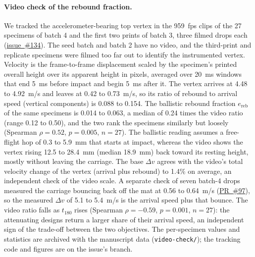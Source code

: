 \documentclass[11pt]{article}
\newcommand{\repo}{https://github.com/vertical-cloud-lab/tensegrity-optimization}
\begin{document}
\paragraph{Video check of the rebound fraction.} We tracked the
accelerometer-bearing top vertex in the \SI{959}{fps} clips of the 27
specimens of batch 4 and the first two prints of batch 3, three filmed
drops each (\href{\repo/issues/134}{issue~\#134}). The seed batch and
batch 2 have no video, and the third-print and replicate specimens were
filmed too far out to identify the instrumented vertex. Velocity is the
frame-to-frame displacement scaled by the specimen's printed overall
height over its apparent height in pixels, averaged over \SI{20}{ms}
windows that end \SI{5}{ms} before impact and begin \SI{5}{ms} after it.
The vertex arrives at 4.48 to \SI{4.92}{m/s} and leaves at 0.42 to
\SI{0.73}{m/s}, so its ratio of rebound to arrival speed (vertical
components) is 0.088 to 0.154. The ballistic rebound fraction
$e_{\mathrm{reb}}$ of the same specimens is 0.014 to 0.063, a median of
0.24 times the video ratio (range 0.12 to 0.50), and the two rank the
specimens similarly but loosely (Spearman $\rho = 0.52$, $p = 0.005$,
$n = 27$). The ballistic reading assumes a free-flight hop of 0.3 to
\SI{5.9}{mm} that starts at impact, whereas the video shows the vertex
rising 12.5 to \SI{28.4}{mm} (median \SI{18.9}{mm}) back toward its
resting height, mostly without leaving the carriage. The base $\Delta v$
agrees with the video's total velocity change of the vertex (arrival
plus rebound) to 1.4\% on average, an independent check of the video
scale. A separate check of seven batch-4 drops measured the carriage
bouncing back off the mat at 0.56 to \SI{0.64}{m/s}
(\href{\repo/pull/97}{PR~\#97}), so the measured $\Delta v$ of 5.1 to
\SI{5.4}{m/s} is the arrival speed plus that bounce. The video ratio
falls as $t_{180}$ rises (Spearman $\rho = -0.59$, $p = 0.001$,
$n = 27$): the attenuating designs return a larger share of their arrival
speed, an independent sign of the trade-off between the two objectives.
The per-specimen values and statistics are archived with the manuscript
data (\texttt{video-check/}); the tracking code and figures are on the
issue's branch.
\end{document}
